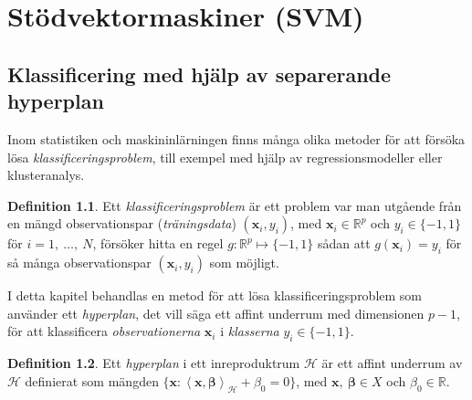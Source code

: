 \documentclass[a4paper, 12pt]{report}
\theoremstyle{definition}
\newtheorem{defi}{Definition}[section]
\theoremstyle{remark}
\newcommand{\bfbeta}{{\boldsymbol{\beta}}}
\newcommand{\bfx}{\mathbf{x}}
\newcommand{\llangle}{\left\langle}
\newcommand{\rrangle}{\right\rangle}
\newcommand{\inner}[2]{\llangle #1, #2 \rrangle}
\newcommand{\hil}{\mathcal{H}}
\begin{document}

\chapter{Stödvektormaskiner (SVM)}

\section{Klassificering med hjälp av separerande hyperplan}

Inom statistiken och maskininlärningen finns många olika metoder för att försöka lösa \emph{klassificeringsproblem}, till exempel med hjälp av regressionsmodeller eller klusteranalys.

\begin{defi}
	Ett \textit{klassificeringsproblem} är ett problem var man utgående från en mängd observationspar (\textit{träningsdata}) $\left(\mathbf{x}_i, y_i\right)$, med $\mathbf{x}_i\in\mathbb{R}^p$ och $y_i\in\{-1, 1\}$ för $i=1,~\dots,~N$, försöker hitta en regel $g: \mathbb{R}^p \longmapsto \{-1, 1\}$ sådan att $g\left(\mathbf{x}_i\right)=y_i$ för så många observationspar $\left(\mathbf{x}_i, y_i\right)$ som möjligt.
\end{defi}

 I detta kapitel behandlas en metod för att lösa klassificeringsproblem som använder ett \emph{hyperplan}, det vill säga ett affint underrum med dimensionen $p-1$, för att klassificera \textit{observationerna} $\mathbf{x}_i$ i \textit{klasserna} $y_i\in\{-1, 1\}$.

\begin{defi}
	Ett \textit{hyperplan} i ett inreproduktrum $\mathcal{H}$ är ett affint underrum av $\mathcal{H}$ definierat som mängden $\{\mathbf{x}: \inner{\bfx}{\bfbeta}_\mathcal{H} + \beta_0=0\}$, med $\mathbf{x},~\bfbeta\in X$ och $\beta_0\in\mathbb{R}$.
\end{defi}
\end{document}
